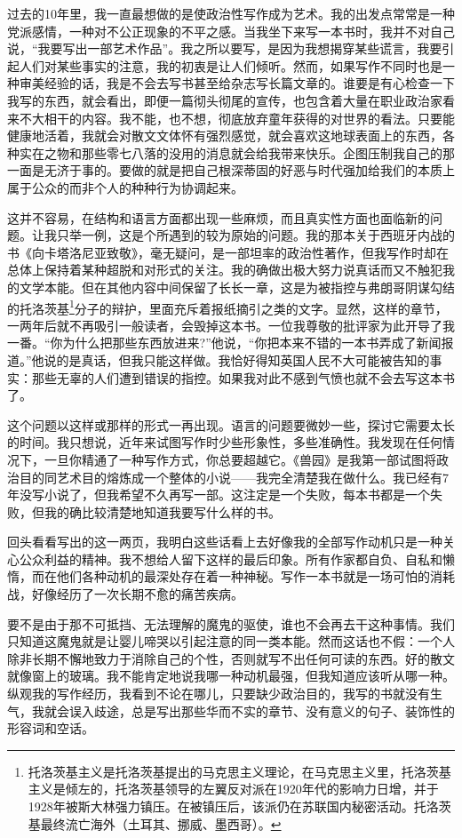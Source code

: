 \documentclass[12pt,a5paper]{ctexbook}
\begin{document}
过去的10年里，我一直最想做的是使政治性写作成为艺术。我的出发点常常是一种党派感情，一种对不公正现象的不平之感。当我坐下来写一本书时，我并不对自己说，“我要写出一部艺术作品”。我之所以要写，是因为我想揭穿某些谎言，我要引起人们对某些事实的注意，我的初衷是让人们倾听。然而，如果写作不同时也是一种审美经验的话，我是不会去写书甚至给杂志写长篇文章的。谁要是有心检查一下我写的东西，就会看出，即便一篇彻头彻尾的宣传，也包含着大量在职业政治家看来不大相干的内容。我不能，也不想，彻底放弃童年获得的对世界的看法。只要能健康地活着，我就会对散文文体怀有强烈感觉，就会喜欢这地球表面上的东西，各种实在之物和那些零七八落的没用的消息就会给我带来快乐。企图压制我自己的那一面是无济于事的。要做的就是把自己根深蒂固的好恶与时代强加给我们的本质上属于公众的而非个人的种种行为协调起来。

这并不容易，在结构和语言方面都出现一些麻烦，而且真实性方面也面临新的问题。让我只举一例，这是个所遇到的较为原始的问题。我的那本关于西班牙内战的书《向卡塔洛尼亚致敬》，毫无疑问，是一部坦率的政治性著作，但我写作时却在总体上保持着某种超脱和对形式的关注。我的确做出极大努力说真话而又不触犯我的文学本能。但在其他内容中间保留了长长一章，这是为被指控与弗朗哥阴谋勾结的托洛茨基\footnote{托洛茨基主义是托洛茨基提出的马克思主义理论，在马克思主义里，托洛茨基主义是倾左的，托洛茨基领导的左翼反对派在1920年代的影响力日增，并于1928年被斯大林强力镇压。在被镇压后，该派仍在苏联国内秘密活动。托洛茨基最终流亡海外（土耳其、挪威、墨西哥）。}分子的辩护，里面充斥着报纸摘引之类的文字。显然，这样的章节，一两年后就不再吸引一般读者，会毁掉这本书。一位我尊敬的批评家为此开导了我一番。“你为什么把那些东西放进来?”他说，“你把本来不错的一本书弄成了新闻报道。”他说的是真话，但我只能这样做。我恰好得知英国人民不大可能被告知的事实：那些无辜的人们遭到错误的指控。如果我对此不感到气愤也就不会去写这本书了。

这个问题以这样或那样的形式一再出现。语言的问题要微妙一些，探讨它需要太长的时间。我只想说，近年来试图写作时少些形象性，多些准确性。我发现在任何情况下，一旦你精通了一种写作方式，你总要超越它。《兽园》是我第一部试图将政治目的同艺术目的熔炼成一个整体的小说——我完全清楚我在做什么。我已经有7年没写小说了，但我希望不久再写一部。这注定是一个失败，每本书都是一个失败，但我的确比较清楚地知道我要写什么样的书。

回头看看写出的这一两页，我明白这些话看上去好像我的全部写作动机只是一种关心公众利益的精神。我不想给人留下这样的最后印象。所有作家都自负、自私和懒惰，而在他们各种动机的最深处存在着一种神秘。写作一本书就是一场可怕的消耗战，好像经历了一次长期不愈的痛苦疾病。

要不是由于那不可抵挡、无法理解的魔鬼的驱使，谁也不会再去干这种事情。我们只知道这魔鬼就是让婴儿啼哭以引起注意的同一类本能。然而这话也不假：一个人除非长期不懈地致力于消除自己的个性，否则就写不出任何可读的东西。好的散文就像窗上的玻璃。我不能肯定地说我哪一种动机最强，但我知道应该听从哪一种。纵观我的写作经历，我看到不论在哪儿，只要缺少政治目的，我写的书就没有生气，我就会误入歧途，总是写出那些华而不实的章节、没有意义的句子、装饰性的形容词和空话。
\end{document}
